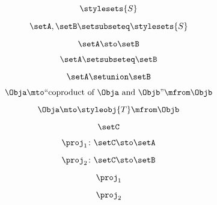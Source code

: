 \begin{forslides}
    \begin{equation}
        \label{eq:feedback-144}
        \stylesets{S}
    \end{equation}

    \begin{equation}
        \label{eq:feedback-145}
        \setA,\setB\setsubseteq \stylesets{S}
    \end{equation}

    \begin{equation}
        \label{eq:feedback-146}
        \setA \sto \setB
    \end{equation}

    \begin{equation}
        \label{eq:feedback-147}
        \setA\setsubseteq \setB
    \end{equation}

    \begin{equation}
        \label{eq:feedback-148}
        \setA\setunion\setB
    \end{equation}

    \begin{equation}
        \label{eq:feedback-149}
        \Obja \mto \text{``coproduct of } \Obja \text{ and } \Objb \text{''}  \mfrom \Objb
    \end{equation}

    \begin{equation}
        \label{eq:feedback-150}
        \Obja \mto \styleobj{T} \mfrom \Objb
    \end{equation}

    \begin{equation}
        \label{eq:feedback-151}
        \setC
    \end{equation}

    \begin{equation}
        \label{eq:feedback-152}
        \proj_1\colon \setC \sto \setA
    \end{equation}

    \begin{equation}
        \label{eq:feedback-153}
        \proj_2\colon \setC \sto \setB
    \end{equation}

    \begin{equation}
        \label{eq:feedback-154}
        \proj_1
    \end{equation}

    \begin{equation}
        \label{eq:feedback-155}
        \proj_2
    \end{equation}


\end{forslides}
